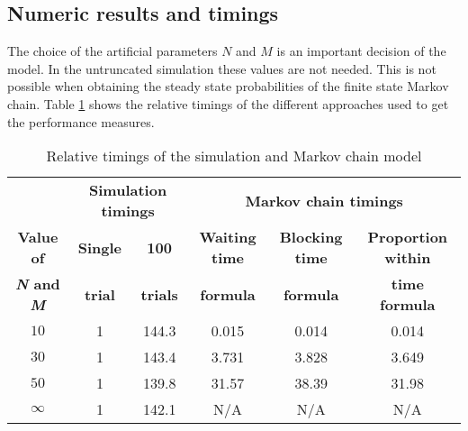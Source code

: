 \subsection{Numeric results and timings}\label{sec:truncation_effect}

The choice of the artificial parameters \(N\) and \(M\) is an important 
decision of the model.
In the untruncated simulation these values are not needed.
This is not possible when obtaining the steady state probabilities of the
finite state Markov chain.
Table \ref{tab:truncation_effect_timings} shows the relative timings of the
different approaches used to get the performance measures.

\tiny
\begin{table}[h]
    \centering
    \begin{tabular}{c|cc|ccc}
        & \multicolumn{2}{c}{\textbf{Simulation timings}} & 
        \multicolumn{3}{c}{\textbf{Markov chain timings}} \\
        \textbf{Value of} & \textbf{Single} & \textbf{100} & 
        \textbf{Waiting time} & \textbf{Blocking time} & 
        \textbf{Proportion within} \\
        \textbf{\textit{N} and \textit{M}} & \textbf{trial} & \textbf{trials} & 
        \textbf{formula} & \textbf{formula} & \textbf{time formula} \\
        \hline
        \(10\) & 1 & 144.3 & 0.015 & 0.014 & 0.014 \\
        \hline
        \(30\) & 1 & 143.4 & 3.731 & 3.828 & 3.649 \\
        \hline
        \(50\) & 1 & 139.8 & 31.57 & 38.39 & 31.98 \\
        \hline
        \(\infty\) & 1 & 142.1 & N/A & N/A & N/A \\
    \end{tabular}
    \caption{Relative timings of the simulation and Markov chain model}
    \label{tab:truncation_effect_timings}
\end{table}
\normalsize